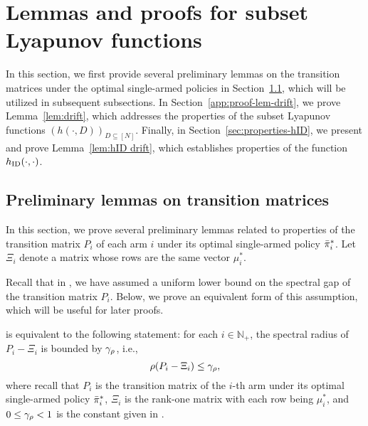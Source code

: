 \section{Lemmas and proofs for subset Lyapunov functions}
\label{sec:lem-proof-subset}

In this section, we first provide several preliminary lemmas on the transition matrices under the optimal single-armed policies in Section~\ref{sec:preliminary-transition}, which will be utilized in subsequent subsections.
In Section~\ref{app:proof-lem-drift}, we prove Lemma~\ref{lem:drift}, which addresses the properties of the subset Lyapunov functions $(h(\cdot,D))_{D\subseteq [N]}$.
Finally, in Section~\ref{sec:properties-hID}, we present and prove Lemma~\ref{lem:hID drift}, which establishes properties of the function $h_{\textnormal{ID}}(\cdot,\cdot)$.

\subsection{Preliminary lemmas on transition matrices}
\label{sec:preliminary-transition}
In this section, we prove several preliminary lemmas related to properties of the transition matrix $P_i$
of each arm $i$ under its optimal single-armed policy ${{\bar{\pi}}^*}_i$. 
Let $\Xi_i$ denote a matrix whose rows are the same vector $\mu_i^*$.


Recall that in , we have assumed a uniform lower bound on the spectral gap of the transition matrix $P_i$. Below, we prove an equivalent form of this assumption, which will be useful for later proofs. 

\begin{lemma}\label{lem:spectral-radius}
     is equivalent to the following statement: for each $i\in \mathbb{N}_+$, the spectral radius of $P_i - \Xi_i$ is bounded by $\gamma_{\rho}$, i.e., 
    \begin{equation}\label{eq:spectral-radius-condition}
        \rho(P_i - \Xi_i) \leq \gamma_{\rho},
    \end{equation}
    where recall that $P_i$ is the transition matrix of the $i$-th arm under its optimal single-armed policy ${{\bar{\pi}}^*}_i$, $\Xi_i$ is the rank-one matrix with each row being $\mu_i^*$, and $0\leq \gamma_{\rho} < 1$ is the constant given in . 
\end{lemma}
    
